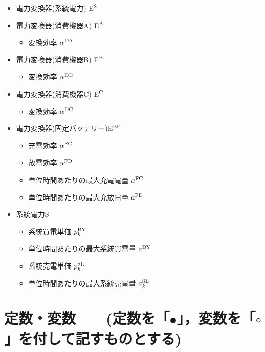 \documentclass{jarticle}
\newcommand{\IB}{$\bullet$}
\newcommand{\IC}{$\circ$}
\newcommand{\IS}{$*$}
\begin{document}
\begin{itemize}
\begin{itemize}
  \end{itemize}
 \item[\IS] 電力変換器(系統電力) E$^{\rm S}$
 \item[\IS] 電力変換器(消費機器A) E$^{\rm A}$
  \begin{itemize}
   \item[\IB] 変換効率 $\alpha^{\rm DA}$
  \end{itemize}
 \item[\IS] 電力変換器(消費機器B) E$^{\rm B}$
  \begin{itemize}
   \item[\IB] 変換効率 $\alpha^{\rm DB}$
  \end{itemize}
 \item[\IS] 電力変換器(消費機器C) E$^{\rm C}$
  \begin{itemize}
   \item[\IB] 変換効率 $\alpha^{\rm DC}$
  \end{itemize}
 \item[\IS] 電力変換器(固定バッテリー)E$^{\rm BF}$
  \begin{itemize}
   \item[\IB] 充電効率 $\alpha^{\rm FC}$
   \item[\IB] 放電効率 $\alpha^{\rm FD}$
  \item[\IB] 単位時間あたりの最大充電電量 $a^{\rm FC}$
  \item[\IB] 単位時間あたりの最大充放電量 $a^{\rm FD}$
  \end{itemize}
 \item[\IS] 系統電力S
   \begin{itemize}
   \item[\IB] 系統買電単価 $p^{\rm BY}_{k}$
   \item[\IB] 単位時間あたりの最大系統買電量 $a^{\rm BY}$
   \item[\IB] 系統売電単価 $p^{\rm SL}_{k}$
   \item[\IB] 単位時間あたりの最大系統売電量 $a^{\rm SL}_{k}$
  \end{itemize}
\end{itemize}

\section{定数・変数 \mbox{\normalsize\rm 
~ (定数を「\IB」，変数を「\IC」を付して記すものとする)}}
\end{document}
